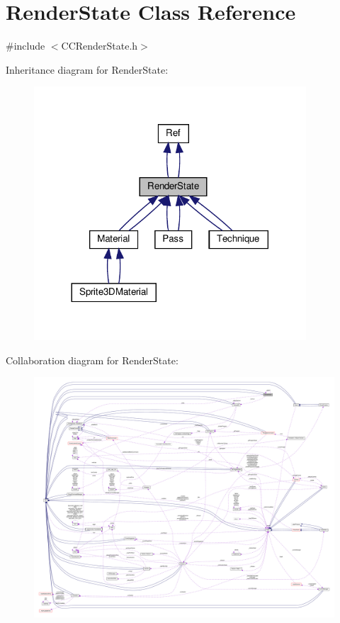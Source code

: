 \hypertarget{classRenderState}{}\section{Render\+State Class Reference}
\label{classRenderState}


{\ttfamily \#include $<$C\+C\+Render\+State.\+h$>$}



Inheritance diagram for Render\+State\+:
\nopagebreak
\begin{figure}[H]
\begin{center}
\leavevmode
\includegraphics[width=288pt]{classRenderState__inherit__graph}
\end{center}
\end{figure}


Collaboration diagram for Render\+State\+:
\nopagebreak
\begin{figure}[H]
\begin{center}
\leavevmode
\includegraphics[width=350pt]{classRenderState__coll__graph}
\end{center}
\end{figure}
